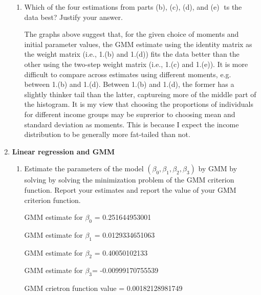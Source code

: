 \documentclass[letterpaper,12pt]{article}
\theoremstyle{definition}
\begin{document}
\begin{enumerate}
\begin{enumerate}
\item Which of the four estimations from parts (b), (c), (d), and (e) ts the data best? Justify your answer.
\par\bigskip
The graphs above suggest that, for the given choice of moments and initial parameter values, the GMM estimate using the identity matrix as the weight matrix (i.e., 1.(b) and 1.(d)) fits the data better than the other using the two-step weight matrix (i.e., 1.(c) and 1.(e)). It is more difficult to compare across estimates using different moments, e.g. between 1.(b) and 1.(d). Between 1.(b) and 1.(d), the former has a slightly thinker tail than the latter, captureing more of the middle part of the histogram. It is my view that choosing the proportions of individuals for different income groups may be suprerior to choosing mean and standard deviation as moments. This is because I expect the income distribution to be generally more fat-tailed than not.

\end{enumerate}

\item \textbf{Linear regression and GMM}
\begin {enumerate}
\item Estimate the parameters of the model $(\beta_{0}, \beta_{1}, \beta_{2}, \beta_{3})$ by GMM by solving by solving the minimization problem of the GMM criterion function. Report your estimates and report the value of your GMM criterion function.
\par\bigskip

GMM estimate for $\beta_{0}$ =  0.251644953001\par
GMM estimate for $\beta_{1}$ =  0.0129334651063\par
GMM estimate for $\beta_{2}$ =  0.40050102133\par
GMM estimate for $\beta_{3}$=  -0.00999170755539\par
GMM crietron function value = 0.00182128981749\par
\end {enumerate}
\end {enumerate}
\end{document}
